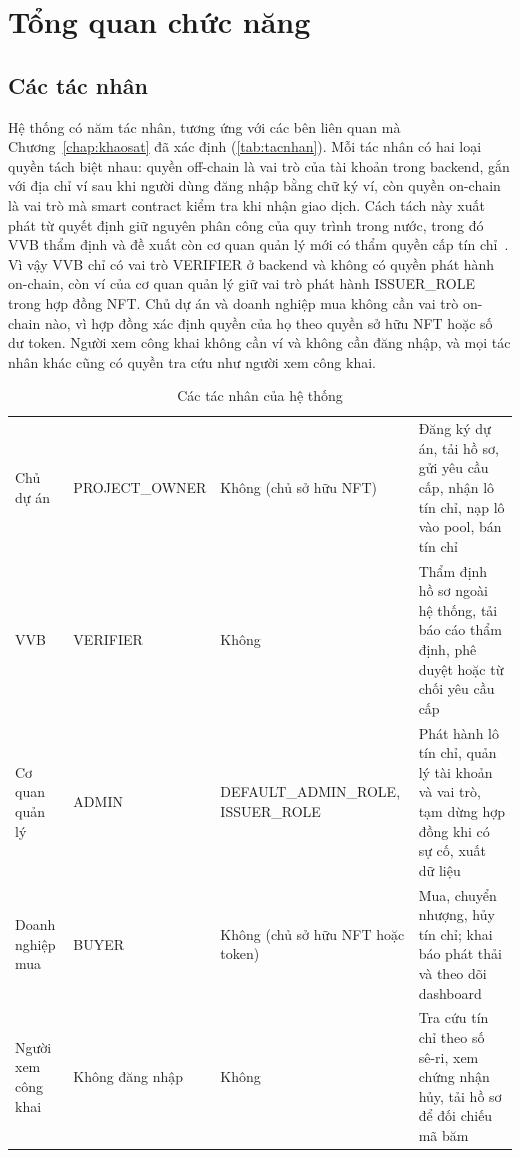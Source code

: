 \section{Tổng quan chức năng}
\label{sec:tongquanchucnang}

\subsection*{Các tác nhân}
\label{subsec:tacnhan}

Hệ thống có năm tác nhân, tương ứng với các bên liên quan mà Chương~\ref{chap:khaosat} đã xác định (\autoref{tab:tacnhan}). Mỗi tác nhân có hai loại quyền tách biệt nhau: quyền off-chain là vai trò của tài khoản trong backend, gắn với địa chỉ ví sau khi người dùng đăng nhập bằng chữ ký ví, còn quyền on-chain là vai trò mà smart contract kiểm tra khi nhận giao dịch. Cách tách này xuất phát từ quyết định giữ nguyên phân công của quy trình trong nước, trong đó VVB thẩm định và đề xuất còn cơ quan quản lý mới có thẩm quyền cấp tín chỉ~\cite{mae2025qd2935,vietnam2026nghidinh396}. Vì vậy VVB chỉ có vai trò VERIFIER ở backend và không có quyền phát hành on-chain, còn ví của cơ quan quản lý giữ vai trò phát hành ISSUER\_ROLE trong hợp đồng NFT. Chủ dự án và doanh nghiệp mua không cần vai trò on-chain nào, vì hợp đồng xác định quyền của họ theo quyền sở hữu NFT hoặc số dư token. Người xem công khai không cần ví và không cần đăng nhập, và mọi tác nhân khác cũng có quyền tra cứu như người xem công khai.

\begin{table}[!htbp]
    \centering
    \caption{Các tác nhân của hệ thống}
    \label{tab:tacnhan}
    \small
    \begin{tabularx}{\textwidth}{|L{2.5cm}|L{2.3cm}|L{3.0cm}|Y|}
        \hline
         &  &  &  \\
        \hline
        Chủ dự án & PROJECT\_\allowbreak OWNER & Không (chủ sở hữu NFT) & Đăng ký dự án, tải hồ sơ, gửi yêu cầu cấp, nhận lô tín chỉ, nạp lô vào pool, bán tín chỉ \\
        \hline
        VVB & VERIFIER & Không & Thẩm định hồ sơ ngoài hệ thống, tải báo cáo thẩm định, phê duyệt hoặc từ chối yêu cầu cấp \\
        \hline
        Cơ quan quản lý & ADMIN & DEFAULT\_\allowbreak ADMIN\_\allowbreak ROLE, ISSUER\_\allowbreak ROLE & Phát hành lô tín chỉ, quản lý tài khoản và vai trò, tạm dừng hợp đồng khi có sự cố, xuất dữ liệu \\
        \hline
        Doanh nghiệp mua & BUYER & Không (chủ sở hữu NFT hoặc token) & Mua, chuyển nhượng, hủy tín chỉ; khai báo phát thải và theo dõi dashboard \\
        \hline
        Người xem công khai & Không đăng nhập & Không & Tra cứu tín chỉ theo số sê-ri, xem chứng nhận hủy, tải hồ sơ để đối chiếu mã băm \\
        \hline
    \end{tabularx}
\end{table}


